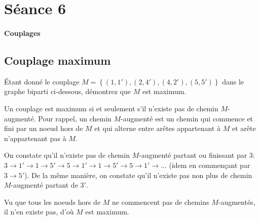 \section{Séance 6}

\paragraph{Couplages}

\subsection{Couplage maximum}
Étant donné le couplage $M = \left\lbrace  (1,1'), (2,4'),(4,2'),(5,5')  \right\rbrace$ dans le graphe biparti ci-dessous, démontrez que $M$ est maximum.

\begin{figure}[h!]
  \begin{center}
  \end{center}
\end{figure}
\begin{solution}
	Un couplage est maximum si et seulement s’il n'existe pas de chemin $M$-augmenté.
    Pour rappel, un chemin $M$-augmenté est un chemin qui commence et fini par un noeud hors de $M$ et qui alterne entre arêtes appartenant à $M$ et arête n'appartenant pas à $M$.
	
	On constate qu'il n'existe pas de chemin $M$-augmenté partant ou finissant par $3$: $3\rightarrow 1'\rightarrow 1\rightarrow 5'\rightarrow 5\rightarrow 1'\rightarrow 1\rightarrow 5'\rightarrow 5\rightarrow 1'\rightarrow ...$ (idem en commençant par $3\rightarrow 5'$).
	De la même manière, on constate qu'il n'existe pas non plus de chemin $M$-augmenté partant de $3'$.
	
	Vu que tous les noeuds hors de $M$ ne commencent pas de chemins $M$-augmentés, il n'en existe pas, d'où $M$ est maximum.
\end{solution}

